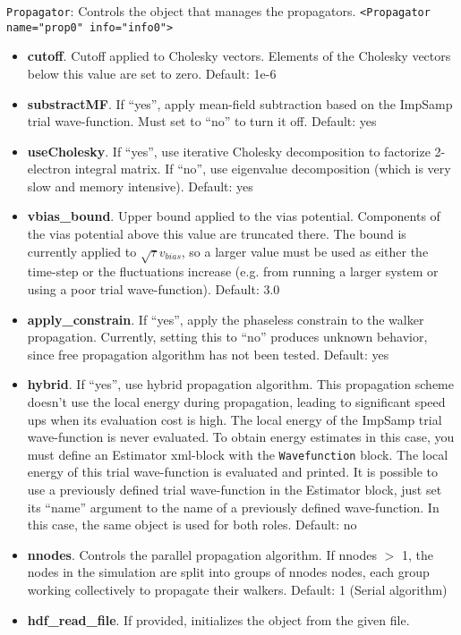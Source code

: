 \texttt{Propagator}: Controls the object that manages the propagators.
\texttt{<Propagator name="prop0" info="info0">}
\begin{itemize}
\item \textbf{cutoff}. Cutoff applied to Cholesky vectors. Elements of the Cholesky vectors below this value are set to zero.
    Default: 1e-6
\item \textbf{substractMF}. If ``yes'', apply mean-field subtraction based on the ImpSamp trial wave-function. Must set to ``no'' to turn it off.
    Default: yes
\item \textbf{useCholesky}. If ``yes'', use iterative Cholesky decomposition to factorize 2-electron integral matrix. If ``no'', use eigenvalue decomposition (which is very slow and memory intensive).
    Default: yes
\item \textbf{vbias\_bound}. Upper bound applied to the vias potential. Components of the vias potential above this value are truncated there. The bound is currently applied to $\sqrt{\tau} v_{bias}$, so a larger value must be used as either the time-step or the fluctuations increase (e.g. from running a larger system or using a poor trial wave-function).
    Default: 3.0
\item \textbf{apply\_constrain}. If ``yes'', apply the phaseless constrain to the walker propagation. Currently, setting this to ``no'' produces unknown behavior, since free propagation algorithm has not been tested.
    Default: yes
\item \textbf{hybrid}. If ``yes'', use hybrid propagation algorithm. This propagation scheme doesn't use the local energy during propagation, leading to significant speed ups when its evaluation  cost is high. The local energy of the ImpSamp trial wave-function is never evaluated. To obtain energy estimates in this case, you must define an Estimator xml-block with the \texttt{Wavefunction} block. The local energy of this trial wave-function is evaluated and printed. It is possible to use a previously defined trial wave-function in the Estimator block, just set its ``name'' argument to the name of a previously defined wave-function. In this case, the same object is used for both roles.
    Default: no
\item \textbf{nnodes}. Controls the parallel propagation algorithm. If nnodes $>$ 1, the nodes in the simulation are split into groups of nnodes nodes, each group working collectively to propagate their walkers.
    Default: 1 (Serial algorithm)
\item \textbf{hdf\_read\_file}. If provided, initializes the object from the given file.

\end{itemize}
